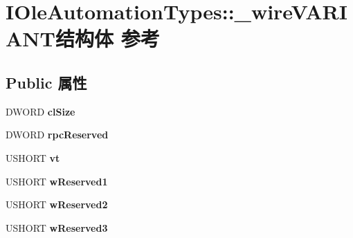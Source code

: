 \hypertarget{struct_i_ole_automation_types_1_1__wire_v_a_r_i_a_n_t}{}\section{I\+Ole\+Automation\+Types\+:\+:\+\_\+wire\+V\+A\+R\+I\+A\+N\+T结构体 参考}
\label{struct_i_ole_automation_types_1_1__wire_v_a_r_i_a_n_t}
\subsection*{Public 属性}
\begin{DoxyCompactItemize}
\item 
\mbox{\label{struct_i_ole_automation_types_1_1__wire_v_a_r_i_a_n_t_a8c6a6adfcfbaf635fde44247e058182b}} 
D\+W\+O\+RD {\bfseries cl\+Size}
\item 
\mbox{\label{struct_i_ole_automation_types_1_1__wire_v_a_r_i_a_n_t_a9adf1909b143412735d07ce536c37bd1}} 
D\+W\+O\+RD {\bfseries rpc\+Reserved}
\item 
\mbox{\label{struct_i_ole_automation_types_1_1__wire_v_a_r_i_a_n_t_a229f1c82ca9b37ea72557115d48500bf}} 
U\+S\+H\+O\+RT {\bfseries vt}
\item 
\mbox{\label{struct_i_ole_automation_types_1_1__wire_v_a_r_i_a_n_t_a785d305e6a5422b0ba1397903cfbf118}} 
U\+S\+H\+O\+RT {\bfseries w\+Reserved1}
\item 
\mbox{\label{struct_i_ole_automation_types_1_1__wire_v_a_r_i_a_n_t_a7572256ba46359bafe5367d6acb6ef89}} 
U\+S\+H\+O\+RT {\bfseries w\+Reserved2}
\item 
\mbox{\label{struct_i_ole_automation_types_1_1__wire_v_a_r_i_a_n_t_a886598a155391a38c2f5682cf37f4894}} 
U\+S\+H\+O\+RT {\bfseries w\+Reserved3}
\item 
\mbox{\label{struct_i_ole_automation_types_1_1__wire_v_a_r_i_a_n_t_a4defe14d10edf6145929e5a9dc411c26}} 

\end{DoxyCompactItemize}
